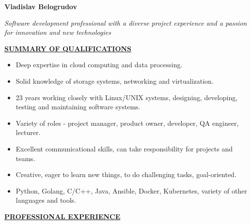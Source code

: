 \documentclass[a4paper,12pt,]{article}
\begin{document}
  \parbox{\textwidth} {
    \parbox[b]{145mm}{
      { \bfseries \LARGE Vladislav Belogrudov}
      \vspace{5ex}

      \large \em
      Software development professional with a diverse project experience and a passion for innovation and new technologies
      \vspace{6ex}
    }
    \hfill
  }

  \uline{ \bfseries{SUMMARY OF QUALIFICATIONS} }
  
  \begin{itemize}
    \item Deep expertise in cloud computing and data processing.

    \item Solid knowledge of storage systems, networking and virtualization.

    \item 23 years working closely with Linux/UNIX systems,
      designing, developing, testing and maintaining software systems.
     
    \item Variety of roles - project manager, product owner, developer, QA engineer, lecturer.

    \item Excellent communicational skills, can take responsibility for projects and teams.
      
    \item Creative, eager to learn new things, to do challenging tasks, goal-oriented.

    \item Python, Golang, C/C++, Java, Ansible, Docker, Kubernetes, variety of other languages and tools.
  \end{itemize}
  
  \vspace{1ex}

  \uline{ \bfseries{PROFESSIONAL EXPERIENCE} }
\end{document}
